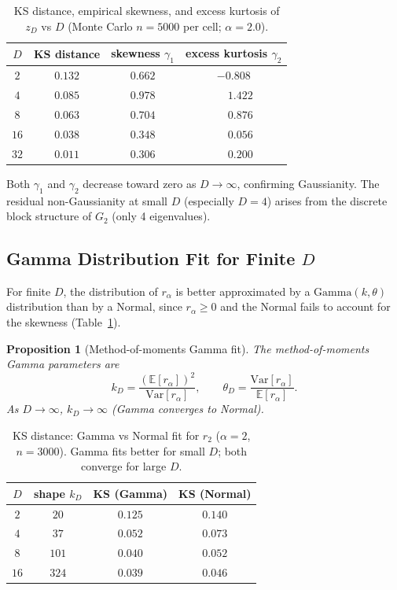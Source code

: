 \documentclass[12pt,a4paper]{article}
\newtheorem{proposition}[theorem]{Proposition}
\begin{document}
\begin{table}[h]
\centering
\caption{KS distance, empirical skewness, and excess kurtosis of $z_D$ vs $D$
(Monte Carlo $n=5000$ per cell; $\alpha=2.0$).}
\label{tab:clt_precision}
\begin{tabular}{c|ccc}
\hline
$D$ & KS distance & skewness $\gamma_1$ & excess kurtosis $\gamma_2$ \\
\hline
$2$  & $0.132$ & $0.662$ & $-0.808$ \\
$4$  & $0.085$ & $0.978$ & $\phantom{-}1.422$ \\
$8$  & $0.063$ & $0.704$ & $\phantom{-}0.876$ \\
$16$ & $0.038$ & $0.348$ & $\phantom{-}0.056$ \\
$32$ & $0.011$ & $0.306$ & $\phantom{-}0.200$ \\
\hline
\end{tabular}
\end{table}

Both $\gamma_1$ and $\gamma_2$ decrease toward zero as $D\to\infty$, confirming
Gaussianity.  The residual non-Gaussianity at small $D$ (especially $D=4$) arises
from the discrete block structure of $G_2$ (only 4 eigenvalues).

\subsection{Gamma Distribution Fit for Finite $D$}
\label{subsec:gamma_fit}

For finite $D$, the distribution of $r_\alpha$ is better approximated by a
$\mathrm{Gamma}(k,\theta)$ distribution than by a Normal, since $r_\alpha\geq0$
and the Normal fails to account for the skewness (Table~\ref{tab:clt_precision}).

\begin{proposition}[Method-of-moments Gamma fit]\label{prop:gamma_fit}
The method-of-moments Gamma parameters are
\[
  k_D = \frac{(\mathbb{E}[r_\alpha])^2}{\mathrm{Var}[r_\alpha]},\qquad
  \theta_D = \frac{\mathrm{Var}[r_\alpha]}{\mathbb{E}[r_\alpha]}.
\]
As $D\to\infty$, $k_D\to\infty$ (Gamma converges to Normal).
\end{proposition}

\begin{table}[h]
\centering
\caption{KS distance: Gamma vs Normal fit for $r_2$ ($\alpha=2$, $n=3000$).
Gamma fits better for small $D$; both converge for large $D$.}
\label{tab:gamma_fit}
\begin{tabular}{c|ccc}
\hline
$D$ & shape $k_D$ & KS (Gamma) & KS (Normal) \\
\hline
$2$  & $20$   & $0.125$ & $0.140$ \\
$4$  & $37$   & $0.052$ & $0.073$ \\
$8$  & $101$  & $0.040$ & $0.052$ \\
$16$ & $324$  & $0.039$ & $0.046$ \\
\hline
\end{tabular}
\end{table}
\end{document}
